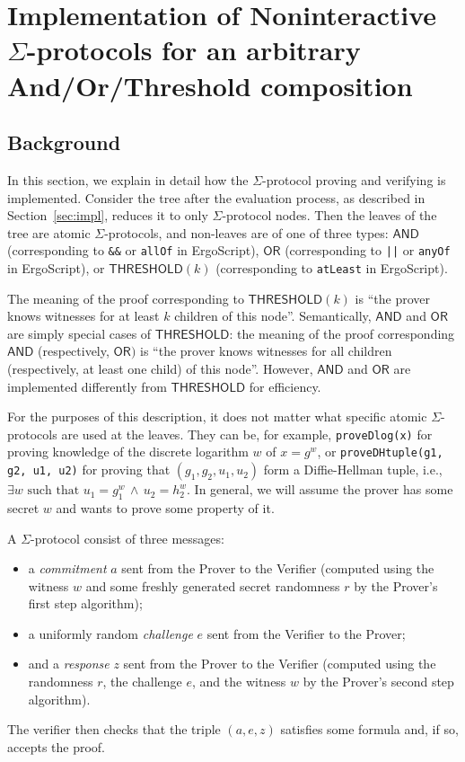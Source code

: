 \documentclass[11pt]{article}
\newcommand{\langname}{ErgoScript\xspace}
\newcommand{\andnode}{\ensuremath{\mathsf{AND}}}
\newcommand{\ornode}{\ensuremath{\mathsf{OR}}}
\newcommand{\tnode}{\ensuremath{\mathsf{THRESHOLD}}}
\begin{document}
\section{Implementation of Noninteractive $\Sigma$-protocols for an arbitrary And/Or/Threshold composition}
\label{app:crypto}
\subsection{Background}


In this section, we explain in detail how the $\Sigma$-protocol proving and verifying is implemented. Consider the tree after the evaluation process, as described in Section~\ref{sec:impl}, reduces it to only $\Sigma$-protocol nodes. Then the leaves of the tree are atomic $\Sigma$-protocols, and non-leaves are of one of three types: $\andnode$ (corresponding to \texttt{\&\&} or \texttt{allOf} in \langname), $\ornode$ (corresponding to \texttt{||} or \texttt{anyOf} in \langname), or $\tnode(k)$ (corresponding to \texttt{atLeast} in \langname). 

The meaning of the proof corresponding to $\tnode(k)$ is ``the prover knows witnesses for at least $k$ children of this node''. Semantically, $\andnode$ and $\ornode$ are simply special cases of $\tnode$: the meaning  of the proof corresponding $\andnode$ (respectively, $\ornode)$ is ``the prover knows witnesses for all children (respectively, at least one child) of this node''. However, $\andnode$ and $\ornode$ are implemented differently from $\tnode$ for efficiency.

For the purposes of this description, it does not matter what specific atomic $\Sigma$-protocols are used at the leaves. They can be, for example, \texttt{proveDlog(x)} for proving knowledge of the discrete logarithm $w$ of $x=g^w$, or \texttt{proveDHtuple(g1, g2, u1, u2)} for proving that $(g_1, g_2, u_1, u_2)$ form a Diffie-Hellman tuple, i.e., $\exists w \mbox{\ such\  that\ } u_1 = g_1^w \, \wedge \, u_2 = h_2^w$. In general, we will assume the prover has some secret $w$ and wants to prove some property of it. 

A $\Sigma$-protocol consist of three messages: 

\begin{itemize}
\item a \emph{commitment} $a$ sent from the Prover to the Verifier (computed using the witness $w$ and some freshly generated secret randomness $r$ by the Prover's first step algorithm);
\item a uniformly random \emph{challenge} $e$ sent from the Verifier to the Prover;
\item and a \emph{response} $z$ sent from the Prover to the Verifier (computed using the randomness $r$, the challenge $e$, and the witness $w$ by the Prover's second step algorithm). 
\end{itemize}
The verifier then checks that the triple $(a, e, z)$ satisfies some formula and, if so, accepts the proof.
\end{document}
